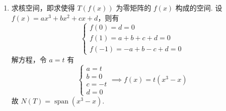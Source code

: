 \documentclass[12pt,fontset=fandol]{ctexart}
\begin{document}
\begin{solve}
\begin{enumerate}
                \item \label{item:7:B:5:1}
                      求核空间，即求使得 $ T(f(x)) $ 为零矩阵的 $ f(x) $ 构成的空间. 设 $ f(x) = ax^3 + bx^2 + cx + d $，则有
                      \[ \begin{cases}
                              f(0) = d = 0             \\
                              f(1) = a + b + c + d = 0 \\
                              f(-1) = -a + b -c + d = 0
                          \end{cases} \]
                      解方程，令 $ a = t $ 有
                      \[ \begin{cases}
                              a = t  \\
                              b = 0  \\
                              c = -t \\
                              d = 0
                          \end{cases} \implies f(x) = t(x^3 - x) \]
                      故 $ N(T) = \operatorname{span}(x^3 - x) $.


\end{enumerate}
\end{solve}
\end{document}
